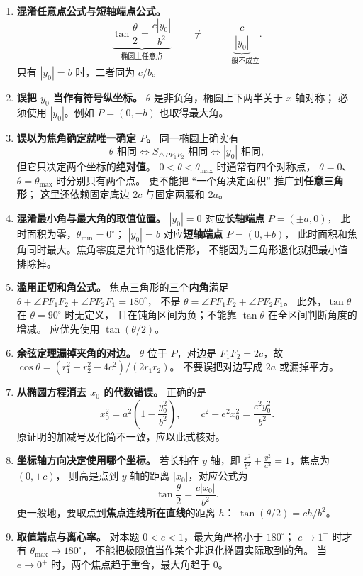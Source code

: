\begin{trapbox}
\begin{enumerate}
  \item \textbf{混淆任意点公式与短轴端点公式。}
  \[
  \underbrace{\tan\frac\theta2=\frac{c|y_0|}{b^2}}_{\text{椭圆上任意点}}
  \qquad\ne\qquad
  \underbrace{\frac c{|y_0|}}_{\text{一般不成立}}.
  \]
  只有 $|y_0|=b$ 时，二者同为 $c/b$。

  \item \textbf{误把 $y_0$ 当作有符号纵坐标。}
  $\theta$ 是非负角，椭圆上下两半关于 $x$ 轴对称；
  必须使用 $|y_0|$。例如 $P=(0,-b)$ 也取得最大角。

  \item \textbf{误以为焦角确定就唯一确定 $P$。}
  同一椭圆上确实有
  \[
    \theta\text{ 相同}\iff
    S_{\triangle PF_1F_2}\text{ 相同}\iff
    |y_0|\text{ 相同},
  \]
  但它只决定两个坐标的\textbf{绝对值}。
  $0<\theta<\theta_{\max}$ 时通常有四个对称点，
  $\theta=0$、$\theta=\theta_{\max}$ 时分别只有两个点。
  更不能把 ``一个角决定面积'' 推广到\textbf{任意三角形}；
  这里还依赖固定底边 $2c$ 与固定两腰和 $2a$。

  \item \textbf{混淆最小角与最大角的取值位置。}
  $|y_0|=0$ 对应\textbf{长轴端点} $P=(\pm a,0)$，
  此时面积为零，\(\theta_{\min}=0^\circ\)；
  $|y_0|=b$ 对应\textbf{短轴端点} $P=(0,\pm b)$，
  此时面积和焦角同时最大。焦角零度是允许的退化情形，
  不能因为三角形退化就把最小值排除掉。

  \item \textbf{滥用正切和角公式。}
  焦点三角形的三个\textbf{内角}满足
  $\theta+\angle PF_1F_2+\angle PF_2F_1=180^\circ$，
  不是 $\theta=\angle PF_1F_2+\angle PF_2F_1$。
  此外，$\tan\theta$ 在 $\theta=90^\circ$ 时无定义，
  且在钝角区间为负；不能靠 $\tan\theta$ 在全区间判断角度的增减。
  应优先使用 $\tan(\theta/2)$。

  \item \textbf{余弦定理漏掉夹角的对边。}
  $\theta$ 位于 $P$，对边是 $F_1F_2=2c$，故
  $\cos\theta=(r_1^2+r_2^2-4c^2)/(2r_1r_2)$。
  不要误把对边写成 $2a$ 或漏掉平方。

  \item \textbf{从椭圆方程消去 $x_0$ 的代数错误。}
  正确的是
  \[
  x_0^2=a^2\left(1-\frac{y_0^2}{b^2}\right),\qquad
  c^2-e^2x_0^2=\frac{c^2y_0^2}{b^2}.
  \]
  原证明的加减号及化简不一致，应以此式核对。

  \item \textbf{坐标轴方向决定使用哪个坐标。}
  若长轴在 $y$ 轴，即
  $\frac{x^2}{b^2}+\frac{y^2}{a^2}=1$，焦点为 $(0,\pm c)$，
  则高是点到 $y$ 轴的距离 $|x_0|$，对应公式为
  \[
  \boxed{\tan\frac\theta2=\frac{c|x_0|}{b^2}}.
  \]
  更一般地，要取点到\textbf{焦点连线所在直线}的距离 $h$：
  $\tan(\theta/2)=ch/b^2$。

  \item \textbf{取值端点与离心率。}
  对本题 $0<e<1$，最大角严格小于 $180^\circ$；
  $e\to1^-$ 时才有 $\theta_{\max}\to180^\circ$，
  不能把极限值当作某个非退化椭圆实际取到的角。
  当 $e\to0^+$ 时，两个焦点趋于重合，最大角趋于 $0$。
\end{enumerate}
\end{trapbox}

